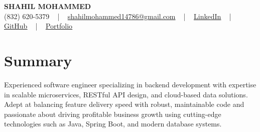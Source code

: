 \documentclass[letterpaper,10pt]{article}
\begin{document}
\begin{center}
    {\fontsize{14pt}{12pt}\selectfont \textbf{\MakeUppercase{Shahil Mohammed}}}\\ \vspace{2pt}
    \fontsize{10pt}{12pt}\selectfont (832) 620-5379 ~ | ~ \href{mailto:shahilmohammed14786@gmail.com}{shahilmohammed14786@gmail.com} ~ | ~  
    \href{https://www.linkedin.com/in/shahil-mohammed-9652931a1/}{\color{blue}\underline{LinkedIn}}  ~ | ~ 
    \href{https://github.com/freakbeast14}{\color{blue}\underline{GitHub}} ~ | ~ 
    \href{https://shahil-mohammed.netlify.app/}{\color{blue}\underline{Portfolio}}
    \vspace{-8pt}
\end{center}

\section{Summary}
\vspace{-2pt}\fontsize{8pt}{9pt}\selectfont
Experienced software engineer specializing in backend development with expertise in scalable microservices, RESTful API design, and cloud-based data solutions. Adept at balancing feature delivery speed with robust, maintainable code and passionate about driving profitable business growth using cutting-edge technologies such as Java, Spring Boot, and modern database systems.
 \vspace{-5pt}
 
\vspace{-2pt}
\end{document}

